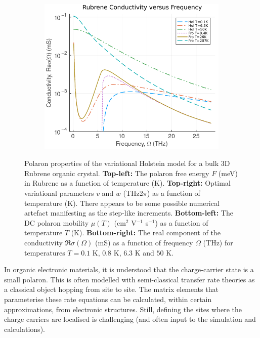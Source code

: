 \begin{figure}[!tbp]
\begin{subfigure}[b]{0.49\textwidth}
    \includegraphics[width=\textwidth]{figures/rubrene_cond_freq.png}
    \label{fig:rubrene_cond_freq}
  \end{subfigure}
  \caption{Polaron properties of the variational Holstein model for a bulk 3D Rubrene organic crystal. \textbf{Top-left:} The polaron free energy $F$ (meV) in Rubrene as a function of temperature (K). \textbf{Top-right:} Optimal variational parameters $v$ and $w$ (THz2$\pi$) as a function of temperature (K). There appears to be some possible numerical artefact manifesting as the step-like increments. \textbf{Bottom-left:} The DC polaron mobility $\mu(T)$ (cm$^2$ V$^{-1}$ s$^{-1}$) as a function of temperature $T$ (K). \textbf{Bottom-right:} The real component of the conductivity $\Re\sigma(\Omega)$ (mS) as a function of frequency $\Omega$ (THz) for temperatures $T = 0.1$ K, $0.8$ K, $6.3$ K and $50$ K.}
  \label{fig:rubrene}
\end{figure}

In organic electronic materials, it is understood that the charge-carrier state is a small polaron.  This is often modelled with semi-classical transfer rate theories as a classical object hopping from site to site. The matrix elements that parameterise these rate equations can be calculated, within certain approximations, from electronic structures. Still, defining the sites where the charge carriers are localised is challenging (and often input to the simulation and calculations). 

